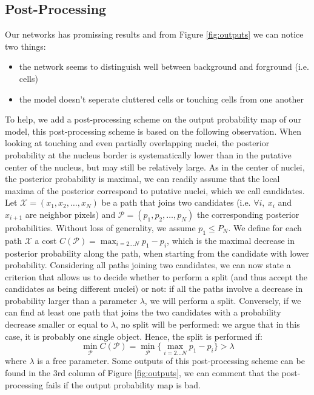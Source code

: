 \documentclass[a4paper,10pt,twocolumn]{article}
\begin{document}

\subsection{Post-Processing}
Our networks has promissing results and from Figure \ref{fig:outputs} we can notice two things:
\begin{itemize}
\item the network seems to distinguish well between background and forground (i.e. cells)
\item the model doesn't seperate cluttered cells or touching cells from one another
\end{itemize}
To help, we add a post-processing scheme on the output probability map of our model, this post-processing 
scheme is based on the following observation. When looking at touching and
even partially overlapping nuclei, the posterior probability at the
nucleus border is systematically lower than in
the putative center of the nucleus, but may still be relatively
large. As in the center of nuclei, the
posterior probability is maximal, we can readily assume that the local
maxima of the posterior correspond to putative nuclei, which we call candidates. Let
$\mathcal{X}=(x_1,x_2,\ldots,x_N)$ be a path that joins two candidates
(i.e. $\forall i, \ x_i$ and $x_{i+1}$ are neighbor pixels) and
$\mathcal{P}=(p_1,p_2,\ldots,p_N)$ the corresponding posterior
probabilities. Without loss of generality, we assume $p_1\leq P_N$.
We define for each path $\mathcal{X}$ a cost
$C(\mathcal{P})=\max_{i=2 \ldots N}{p_1-p_i}$, which is the maximal
decrease in posterior probability along the path, when starting from
the candidate with lower probability.  Considering all paths joining two
candidates, we can now state a criterion that allows us to decide whether to
perform a split (and thus accept the candidates as being different
nuclei) or not: if all the paths involve a decrease in probability
larger than a parameter $\lambda$, we will perform a
split. Conversely, if we can find at least one path that joins the two candidates
with a probability decrease smaller or equal to $\lambda$, no split
will be performed: we argue that in this case, it is probably one
single object. Hence, the split is performed if: 
\begin{equation*}
\min_{\mathcal{P}}C(\mathcal{P}) = \min_{\mathcal{P}} \{\max_{i=2
  \ldots N}{p_1-p_i}\} > \lambda
\end{equation*}
where $\lambda$ is a free parameter. Some outputs of this 
post-processing scheme can be found in the 3rd 
column of Figure \ref{fig:outputs}, we can comment that the 
post-processing fails if the output probability map is bad.
\end{document}
